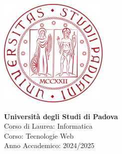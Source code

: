 \begin{minipage}[]{0.3\textwidth}
\includegraphics[width=\linewidth]{immagini/logo_unipd.png}
\end{minipage}
\hspace{0.05\textwidth}
\begin{minipage}[]{0.65\textwidth}
  \textcolor{unipd}{
    \textbf{Università degli Studi di Padova} \\
    Corso di Laurea: Informatica \\
    Corso: Tecnologie Web \\
    Anno Accademico: 2024/2025
  }
\end{minipage}

\bigskip
\bigskip
\bigskip